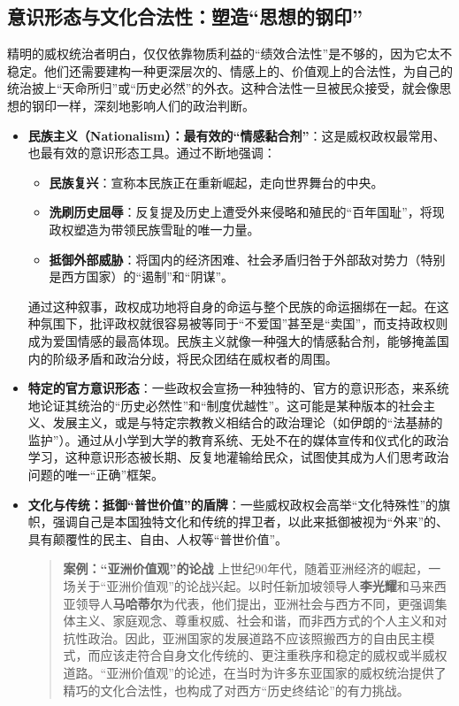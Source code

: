 \subsection{意识形态与文化合法性：塑造“思想的钢印”}

精明的威权统治者明白，仅仅依靠物质利益的“绩效合法性”是不够的，因为它太不稳定。他们还需要建构一种更深层次的、情感上的、价值观上的合法性，为自己的统治披上“天命所归”或“历史必然”的外衣。这种合法性一旦被民众接受，就会像思想的钢印一样，深刻地影响人们的政治判断。

\begin{itemize}
    \item \textbf{民族主义（Nationalism）：最有效的“情感黏合剂”}：这是威权政权最常用、也最有效的意识形态工具。通过不断地强调：
    \begin{itemize}
        \item \textbf{民族复兴}：宣称本民族正在重新崛起，走向世界舞台的中央。
        \item \textbf{洗刷历史屈辱}：反复提及历史上遭受外来侵略和殖民的“百年国耻”，将现政权塑造为带领民族雪耻的唯一力量。
        \item \textbf{抵御外部威胁}：将国内的经济困难、社会矛盾归咎于外部敌对势力（特别是西方国家）的“遏制”和“阴谋”。
    \end{itemize}
    通过这种叙事，政权成功地将自身的命运与整个民族的命运捆绑在一起。在这种氛围下，批评政权就很容易被等同于“不爱国”甚至是“卖国”，而支持政权则成为爱国情感的最高体现。民族主义就像一种强大的情感黏合剂，能够掩盖国内的阶级矛盾和政治分歧，将民众团结在威权者的周围。
    \item \textbf{特定的官方意识形态}：一些政权会宣扬一种独特的、官方的意识形态，来系统地论证其统治的“历史必然性”和“制度优越性”。这可能是某种版本的社会主义、发展主义，或是与特定宗教教义相结合的政治理论（如伊朗的“法基赫的监护”）。通过从小学到大学的教育系统、无处不在的媒体宣传和仪式化的政治学习，这种意识形态被长期、反复地灌输给民众，试图使其成为人们思考政治问题的唯一“正确”框架。
    \item \textbf{文化与传统：抵御“普世价值”的盾牌}：一些威权政权会高举“文化特殊性”的旗帜，强调自己是本国独特文化和传统的捍卫者，以此来抵御被视为“外来”的、具有颠覆性的民主、自由、人权等“普世价值”。
    \begin{quote}
    \textbf{案例：“亚洲价值观”的论战}
    上世纪90年代，随着亚洲经济的崛起，一场关于“亚洲价值观”的论战兴起。以时任新加坡领导人\textbf{李光耀}和马来西亚领导人\textbf{马哈蒂尔}为代表，他们提出，亚洲社会与西方不同，更强调集体主义、家庭观念、尊重权威、社会和谐，而非西方式的个人主义和对抗性政治。因此，亚洲国家的发展道路不应该照搬西方的自由民主模式，而应该走符合自身文化传统的、更注重秩序和稳定的威权或半威权道路。“亚洲价值观”的论述，在当时为许多东亚国家的威权统治提供了精巧的文化合法性，也构成了对西方“历史终结论”的有力挑战。
    \end{quote}
\end{itemize}

